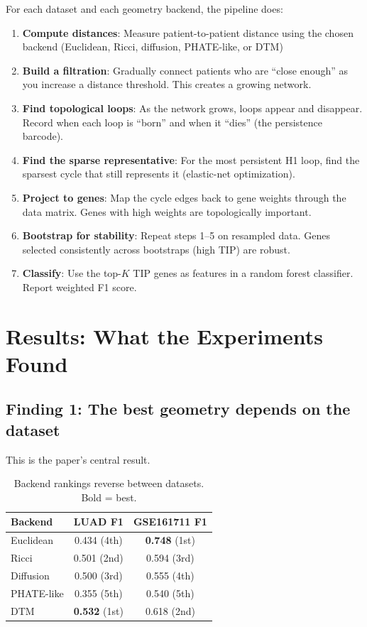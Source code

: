 \documentclass[11pt]{article}
\begin{document}
For each dataset and each geometry backend, the pipeline does:

\begin{enumerate}
    \item \textbf{Compute distances}: Measure patient-to-patient distance using the chosen backend (Euclidean, Ricci, diffusion, PHATE-like, or DTM)
    \item \textbf{Build a filtration}: Gradually connect patients who are ``close enough'' as you increase a distance threshold. This creates a growing network.
    \item \textbf{Find topological loops}: As the network grows, loops appear and disappear. Record when each loop is ``born'' and when it ``dies'' (the persistence barcode).
    \item \textbf{Find the sparse representative}: For the most persistent H1 loop, find the sparsest cycle that still represents it (elastic-net optimization).
    \item \textbf{Project to genes}: Map the cycle edges back to gene weights through the data matrix. Genes with high weights are topologically important.
    \item \textbf{Bootstrap for stability}: Repeat steps 1--5 on resampled data. Genes selected consistently across bootstraps (high TIP) are robust.
    \item \textbf{Classify}: Use the top-$K$ TIP genes as features in a random forest classifier. Report weighted F1 score.
\end{enumerate}

\section{Results: What the Experiments Found}
\label{sec:results}

\subsection{Finding 1: The best geometry depends on the dataset}

This is the paper's central result.

\begin{table}[h]
\centering
\begin{tabular}{lcc}
\toprule
\textbf{Backend} & \textbf{LUAD F1} & \textbf{GSE161711 F1} \\
\midrule
Euclidean & 0.434 (4th) & \textbf{0.748} (1st) \\
Ricci & 0.501 (2nd) & 0.594 (3rd) \\
Diffusion & 0.500 (3rd) & 0.555 (4th) \\
PHATE-like & 0.355 (5th) & 0.540 (5th) \\
DTM & \textbf{0.532} (1st) & 0.618 (2nd) \\
\bottomrule
\end{tabular}
\caption{Backend rankings reverse between datasets. Bold = best.}
\end{table}
\end{document}
